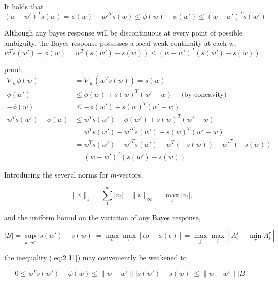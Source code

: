 \documentclass[11pt]{article}
\numberwithin{equation}{section}
\theoremstyle{boldStyle}
\begin{document}
It holds that 
\begin{equation} \label{eq:2.10}
    (w - w')^T s(w) = \phi(w) - w'^T s(w) \leq \phi(w) - \phi(w') \leq (w - w')^T s(w')
\end{equation}

Although any bayes response will be discontinuous at every point of possible ambiguity, the Bayes response possesses a local weak continuity at each w,
\begin{equation} \label{eq:2.11}
    w^T s(w') - \phi(w) = w^T (s(w') - s(w)) \leq (w - w')^T (s(w') - s(w)) 
\end{equation}

proof:
\begin{align*}
    \nabla_w \phi(w) &= \nabla_w (w^T s(w)) = s(w) \\
    \phi(w') &\leq \phi(w) + s(w)^T (w' - w) \quad \text{ (by concavity) } \\
    -\phi(w) &\leq -\phi(w') + s(w)^T (w' - w) \\
    w^T s(w') - \phi(w) &\leq w^T s(w') -\phi(w') + s(w)^T (w' - w) \\
    &= w^T s(w') - w'^T s(w') + s(w)^T (w' - w) \\
    &= w^T s(w') - w'^T s(w') + w^T (-s(w)) - w'^T (-s(w)) \\
    &= (w - w')^T (s(w') - s(w)) 
\end{align*}


Introducing the several norms for \( m \)-vectors,

\begin{equation} \label{eq:2.12}
\|v\|_1 = \sum_{1}^{m} |v_i| \quad \|v\|_\infty = \max_{i} |v_i|,
\end{equation}

and the uniform bound on the variation of any Bayes response,

\begin{equation} \label{eq:2.13}
|B| = \sup_{w, w'} |s(w') - s(w)| = \max_{\sigma} \max_{\epsilon} [\epsilon \sigma - \phi (\epsilon)] = \max_{j} \max_{i} [A^j_i - \min_{r}A^r_i]
\end{equation}

the inequality (\ref{eq:2.11}) may conveniently be weakened to

\begin{bluebox}
\begin{equation} \label{eq:2.14}
0 \leq w^T s(w') - \phi(w) \leq \|w - w'\| |s(w') - s(w)| \leq \|w - w'\| |B|.
\end{equation}
\end{bluebox}
\end{document}
